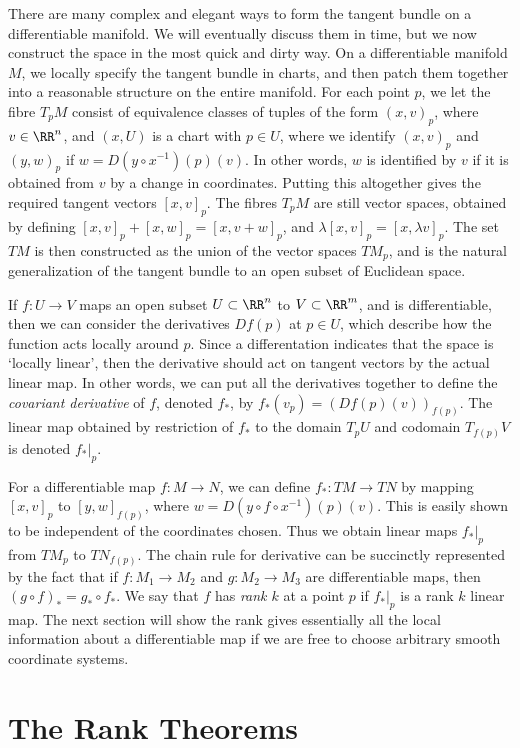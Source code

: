 There are many complex and elegant ways to form the tangent bundle on a differentiable manifold. We will eventually discuss them in time, but we now construct the space in the most quick and dirty way. On a differentiable manifold $M$, we locally specify the tangent bundle in charts, and then patch them together into a reasonable structure on the entire manifold. For each point $p$, we let the fibre $T_pM$ consist of equivalence classes of tuples of the form $(x,v)_p$, where $v \in \RR^n$, and $(x,U)$ is a chart with $p \in U$, where we identify $(x,v)_p$ and $(y,w)_p$ if $w = D(y \circ x^{-1})(p)(v)$. In other words, $w$ is identified by $v$ if it is obtained from $v$ by a change in coordinates. Putting this altogether gives the required tangent vectors $[x,v]_p$. The fibres $T_pM$ are still vector spaces, obtained by defining $[x,v]_p + [x,w]_p = [x,v+w]_p$, and $\lambda [x,v]_p = [x,\lambda v]_p$. The set $TM$ is then constructed as the union of the vector spaces $TM_p$, and is the natural generalization of the tangent bundle to an open subset of Euclidean space.

If $f: U \to V$ maps an open subset $U \subset \RR^n$ to $V \subset \RR^m$, and is differentiable, then we can consider the derivatives $Df(p)$ at $p \in U$, which describe how the function acts locally around $p$. Since a differentation indicates that the space is `locally linear', then the derivative should act on tangent vectors by the actual linear map. In other words, we can put all the derivatives together to define the \emph{covariant derivative} of $f$, denoted $f_*$, by $f_*(v_p) = (Df(p)(v))_{f(p)}$. The linear map obtained by restriction of $f_*$ to the domain $T_p U$ and codomain $T_{f(p)} V$ is denoted $f_*|_p$.

For a differentiable map $f:M \to N$, we can define $f_*: TM \to TN$ by mapping $[x,v]_p$ to $[y,w]_{f(p)}$, where $w = D(y \circ f \circ x^{-1})(p)(v)$. This is easily shown to be independent of the coordinates chosen. Thus we obtain linear maps $f_*|_p$ from $TM_p$ to $TN_{f(p)}$. The chain rule for derivative can be succinctly represented by the fact that if $f: M_1 \to M_2$ and $g: M_2 \to M_3$ are differentiable maps, then $(g \circ f)_* = g_* \circ f_*$. We say that $f$ has \emph{rank $k$} at a point $p$ if $f_*|_p$ is a rank $k$ linear map. The next section will show the rank gives essentially all the local information about a differentiable map if we are free to choose arbitrary smooth coordinate systems.


\section{The Rank Theorems}

